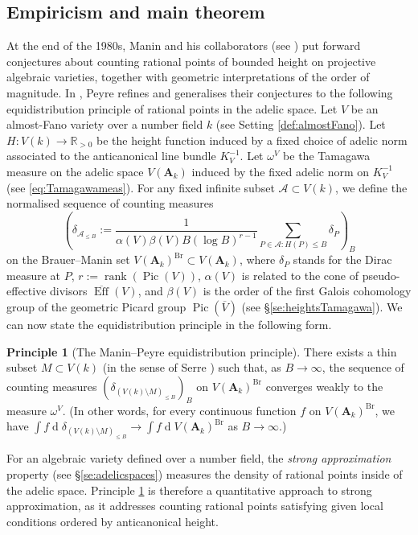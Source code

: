 \documentclass[11pt,letterpaper]{amsart}
\newcommand{\BR}{{\mathbb {R}}}
\newcommand{\CA}{{\mathcal {A}}}
\newcommand{\RA}{{\mathbf {A}}}
\newcommand{\Pic}{\operatorname{Pic}}
\theoremstyle{plain}
\numberwithin{equation}{section}
\theoremstyle{definition}
\newtheorem{principle}[theorem]{Principle}
\theoremstyle{remark}
\begin{document}
\subsection{Empiricism and main theorem}
At the end of the 1980s, Manin and his collaborators (see \cite{Bat-Manin,F-M-T}) put forward conjectures about counting rational points of bounded height on projective algebraic varieties, together with geometric interpretations of the order of magnitude.  In \cite{Peyre,PeyreLille}, Peyre refines and generalises their conjectures to the following equidistribution principle of rational points in the adelic space. 
Let $V$ be an almost-Fano variety over a number field $k$ (see Setting \ref{def:almostFano}). Let $H:V(k)\to\BR_{>0}$ be the height function induced by a fixed choice of adelic norm associated to the anticanonical line bundle $K_V^{-1}$. 
Let $\omega^V$ be the Tamagawa measure on the adelic space $V(\RA_k)$ induced by the fixed adelic norm on $K_V^{-1}$ (see \eqref{eq:Tamagawameas}). For any fixed infinite subset $\CA\subset V(k)$, we define the normalised sequence of counting measures	\begin{equation}\label{eq:seqVAk}
	\left(\delta_{\CA_{\leqslant B}}:=\frac{1}{\alpha(V)\beta(V)B (\log B)^{r-1}}\sum_{P\in \CA:H(P)\leqslant B} \delta_P\right)_B
\end{equation} on the Brauer--Manin set $V(\RA_k)^{\operatorname{Br}}\subset V(\RA_k)$, where $\delta_P$ stands for the Dirac measure at $P$, $r:=\operatorname{rank}(\Pic(V))$, $\alpha(V)$ is related to the cone of pseudo-effective divisors $\overline{\operatorname{Eff}}(V)$, and $\beta(V)$ is the order of the first Galois cohomology group of the geometric Picard group $\Pic(\overline{V})$ (see \S\ref{se:heightsTamagawa}). We can now state  the equidistribution principle in the following form.
\begin{principle}[The Manin--Peyre equidistribution principle]\label{prin:Manin-Peyre}
	There exists a thin subset $M\subset V(k)$ (in the sense of Serre \cite[Definition 3.1.1]{Serre}) such that, as $B\to \infty$, the sequence of counting measures $(\delta_{(V(k)\setminus M)_{\leqslant B}})_B$ on $V(\RA_k)^{\operatorname{Br}}$
	converges weakly to the measure $\omega^V$. (In other words, for every continuous function $f$ on $V(\RA_k)^{\operatorname{Br}}$, we have $\int f \operatorname{d}\delta_{(V(k)\setminus M)_{\leqslant B}}\to \int f \operatorname{d}V(\RA_k)^{\operatorname{Br}}$ as $B\to \infty$.)
\end{principle} 
For an algebraic variety defined over a number field, the \emph{strong approximation} property (see \S\ref{se:adelicspaces}) measures the density of rational points inside of the adelic space. Principle \ref{prin:Manin-Peyre} is therefore a quantitative approach to strong approximation, as it addresses counting rational points satisfying given local conditions ordered by anticanonical height.
\end{document}
